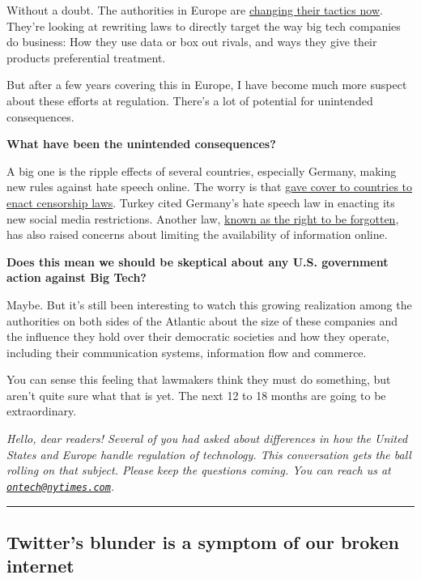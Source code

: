 Without a doubt. The authorities in Europe are
\href{https://www.nytimes.com/2020/07/30/technology/europe-new-phase-tech-amazon-apple-facebook-google.html}{changing
their tactics now}. They're looking at rewriting laws to directly target
the way big tech companies do business: How they use data or box out
rivals, and ways they give their products preferential treatment.

But after a few years covering this in Europe, I have become much more
suspect about these efforts at regulation. There's a lot of potential
for unintended consequences.

\textbf{What have been the unintended consequences?}

A big one is the ripple effects of several countries, especially
Germany, making new rules against hate speech online. The worry is that
\href{https://www.nytimes.com/2019/05/06/technology/europe-tech-censorship.html}{gave
cover to countries to enact censorship laws}. Turkey cited Germany's
hate speech law in enacting its new social media restrictions. Another
law,
\href{https://www.nytimes.com/2019/09/23/technology/right-to-be-forgotten-law-europe.html}{known
as the right to be forgotten}, has also raised concerns about limiting
the availability of information online.

\textbf{Does this mean we should be skeptical about any U.S. government
action against Big Tech?}

Maybe. But it's still been interesting to watch this growing realization
among the authorities on both sides of the Atlantic about the size of
these companies and the influence they hold over their democratic
societies and how they operate, including their communication systems,
information flow and commerce.

You can sense this feeling that lawmakers think they must do something,
but aren't quite sure what that is yet. The next 12 to 18 months are
going to be extraordinary.

\emph{Hello, dear readers! Several of you had asked about differences in
how the United States and Europe handle regulation of technology. This
conversation gets the ball rolling on that subject. Please keep the
questions coming. You can reach us at
\href{mailto:ontech@nytimes.com}{\nolinkurl{ontech@nytimes.com}}.}

\begin{center}\rule{0.5\linewidth}{\linethickness}\end{center}

\hypertarget{twitters-blunder-is-a-symptom-of-our-broken-internet}{%
\subsection{Twitter's blunder is a symptom of our broken
internet}\label{twitters-blunder-is-a-symptom-of-our-broken-internet}}

